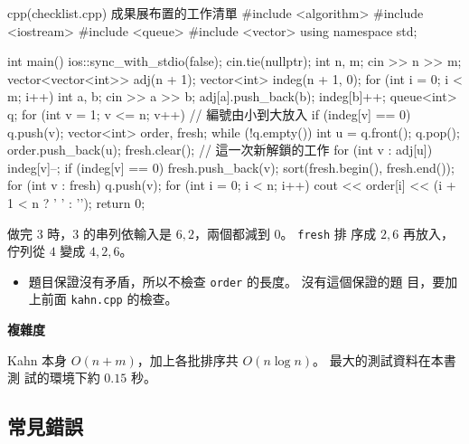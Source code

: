 \begin{example}[label=ex:checklist]{cpp}{(checklist.cpp) 成果展布置的工作清單}
#include <algorithm>
#include <iostream>
#include <queue>
#include <vector>
using namespace std;

int main() {
    ios::sync_with_stdio(false);
    cin.tie(nullptr);
    int n, m;
    cin >> n >> m;
    vector<vector<int>> adj(n + 1);
    vector<int> indeg(n + 1, 0);
    for (int i = 0; i < m; i++) {
        int a, b;
        cin >> a >> b;
        adj[a].push_back(b);
        indeg[b]++;
    }
    queue<int> q;
    for (int v = 1; v <= n; v++) {               // 編號由小到大放入
        if (indeg[v] == 0) {
            q.push(v);
        }
    }
    vector<int> order, fresh;
    while (!q.empty()) {
        int u = q.front();
        q.pop();
        order.push_back(u);
        fresh.clear();                           // 這一次新解鎖的工作
        for (int v : adj[u]) {
            indeg[v]--;
            if (indeg[v] == 0) {
                fresh.push_back(v);
            }
        }
        sort(fresh.begin(), fresh.end());
        for (int v : fresh) {
            q.push(v);
        }
    }
    for (int i = 0; i < n; i++) {
        cout << order[i] << (i + 1 < n ? ' ' : '\n');
    }
    return 0;
}
\end{example}


做完 $3$ 時，$3$ 的串列依輸入是 $6, 2$，兩個都減到 $0$。 \texttt{fresh} 排
序成 $2, 6$ 再放入，佇列從 $4$ 變成 $4, 2, 6$。

\begin{itemize}
\item 題目保證沒有矛盾，所以不檢查 \texttt{order} 的長度。 沒有這個保證的題
目，要加上前面 \texttt{kahn.cpp} 的檢查。
\end{itemize}

\textbf{複雜度}

Kahn 本身 $O(n + m)$，加上各批排序共 $O(n \log n)$。 最大的測試資料在本書測
試的環境下約 $0.15$ 秒。

\subsection{常見錯誤}

